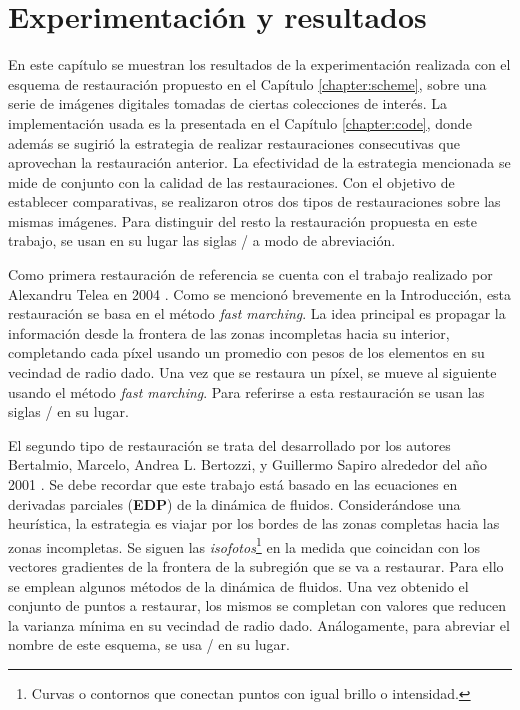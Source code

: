 \chapter{Experimentaci\'on y resultados}\label{chapter:results}
En este cap\'itulo se muestran los resultados de la experimentaci\'on realizada con el esquema de restauraci\'on propuesto en el Cap\'itulo \ref{chapter:scheme}, sobre una serie de im\'agenes digitales tomadas de ciertas colecciones de inter\'es. La implementaci\'on usada es la presentada en el Cap\'itulo \ref{chapter:code}, donde adem\'as se sugiri\'o la estrategia de realizar restauraciones consecutivas que aprovechan la restauraci\'on anterior. La efectividad de la estrategia mencionada se mide de conjunto con la calidad de las restauraciones. Con el objetivo de establecer comparativas, se realizaron otros dos tipos de restauraciones sobre las mismas im\'agenes. Para distinguir del resto la restauraci\'on propuesta en este trabajo, se usan en su lugar las siglas \SOP/ a modo de abreviaci\'on.

Como primera restauraci\'on de referencia se cuenta con el trabajo realizado por Alexandru Telea en 2004 \cite{telea2004image}. Como se mencion\'o brevemente en la Introducci\'on, esta restauraci\'on se basa en el m\'etodo \textit{fast marching}. La idea principal es propagar la informaci\'on desde la frontera de las zonas incompletas hacia su interior, completando cada p\'ixel usando un promedio con pesos de los elementos en su vecindad de radio dado. Una vez que se restaura un p\'ixel, se mueve al siguiente usando el m\'etodo \textit{fast marching}. Para referirse a esta restauraci\'on se usan las siglas \TELEA/ en su lugar.

El segundo tipo de restauraci\'on se trata del desarrollado por los autores Bertalmio, Marcelo, Andrea L. Bertozzi, y Guillermo Sapiro alrededor del año 2001 \cite{bertalmio2001navier}. Se debe recordar que este trabajo est\'a basado en las ecuaciones en derivadas parciales (\textbf{EDP}) de la din\'amica de fluidos. Considerándose una heur\'istica, la estrategia es viajar por los bordes de las zonas completas hacia las zonas incompletas. Se siguen las \textit{isofotos}\footnote{Curvas o contornos que conectan puntos con igual brillo o intensidad.} en la medida que coincidan con los vectores gradientes de la frontera de la subregi\'on que se va a restaurar. Para ello se emplean algunos m\'etodos de la din\'amica de fluidos. Una vez obtenido el conjunto de puntos a restaurar, los mismos se completan con valores que reducen la varianza m\'inima en su vecindad de radio dado. An\'alogamente, para abreviar el nombre de este esquema, se usa \NS/ en su lugar.

